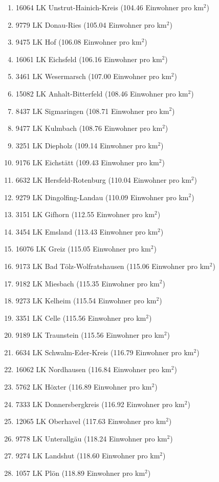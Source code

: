 \begin{enumerate}[itemsep=-6mm]
\item 16064 LK Unstrut-Hainich-Kreis (104.46 Einwohner pro km$^2$)
\item 9779 LK Donau-Ries (105.04 Einwohner pro km$^2$)
\item 9475 LK Hof (106.08 Einwohner pro km$^2$)
\item 16061 LK Eichsfeld (106.16 Einwohner pro km$^2$)
\item 3461 LK Wesermarsch (107.00 Einwohner pro km$^2$)
\item 15082 LK Anhalt-Bitterfeld (108.46 Einwohner pro km$^2$)
\item 8437 LK Sigmaringen (108.71 Einwohner pro km$^2$)
\item 9477 LK Kulmbach (108.76 Einwohner pro km$^2$)
\item 3251 LK Diepholz (109.14 Einwohner pro km$^2$)
\item 9176 LK Eichstätt (109.43 Einwohner pro km$^2$)
\item 6632 LK Hersfeld-Rotenburg (110.04 Einwohner pro km$^2$)
\item 9279 LK Dingolfing-Landau (110.09 Einwohner pro km$^2$)
\item 3151 LK Gifhorn (112.55 Einwohner pro km$^2$)
\item 3454 LK Emsland (113.43 Einwohner pro km$^2$)
\item 16076 LK Greiz (115.05 Einwohner pro km$^2$)
\item 9173 LK Bad Tölz-Wolfratshausen (115.06 Einwohner pro km$^2$)
\item 9182 LK Miesbach (115.35 Einwohner pro km$^2$)
\item 9273 LK Kelheim (115.54 Einwohner pro km$^2$)
\item 3351 LK Celle (115.56 Einwohner pro km$^2$)
\item 9189 LK Traunstein (115.56 Einwohner pro km$^2$)
\item 6634 LK Schwalm-Eder-Kreis (116.79 Einwohner pro km$^2$)
\item 16062 LK Nordhausen (116.84 Einwohner pro km$^2$)
\item 5762 LK Höxter (116.89 Einwohner pro km$^2$)
\item 7333 LK Donnersbergkreis (116.92 Einwohner pro km$^2$)
\item 12065 LK Oberhavel (117.63 Einwohner pro km$^2$)
\item 9778 LK Unterallgäu (118.24 Einwohner pro km$^2$)
\item 9274 LK Landshut (118.60 Einwohner pro km$^2$)
\item 1057 LK Plön (118.89 Einwohner pro km$^2$)

\end{enumerate}
